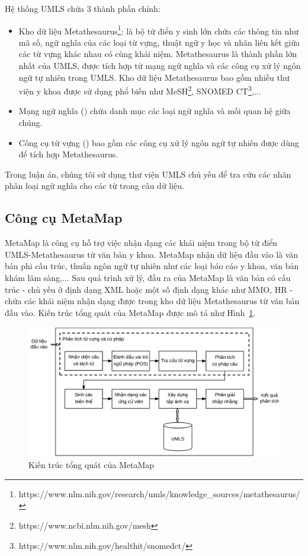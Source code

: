 Hệ thống UMLS chứa 3 thành phần chính:
\begin{itemize}
\item Kho dữ liệu Metathesaurus\footnote{https://www.nlm.nih.gov/research/umls/knowledge\_sources/metathesaurus/}: là bộ từ điển y sinh lớn chứa các thông tin như mã số, ngữ nghĩa của các loại từ vựng, thuật ngữ y học và nhãn liên kết giữa các từ vựng khác nhau có cùng khái niệm. Metathesaurus là thành phần lớn nhất của UMLS, được tích hợp từ mạng ngữ nghĩa và các công cụ xử lý ngôn ngữ tự nhiên trong UMLS. Kho dữ liệu Metathesaurus bao gồm nhiều thư viện y khoa được sử dụng phổ biến như MeSH\footnote{https://www.ncbi.nlm.nih.gov/mesh}, SNOMED CT\footnote{https://www.nlm.nih.gov/healthit/snomedct/},...
\item Mạng ngữ nghĩa () chứa danh mục các loại ngữ nghĩa và mối quan hệ giữa chúng.
\item Công cụ từ vựng () bao gồm các công cụ xử lý ngôn ngữ tự nhiên được dùng để tích hợp Metathesaurus.
\end{itemize}

Trong luận án, chúng tôi sử dụng thư viện UMLS chủ yếu để tra cứu các nhãn phân loại ngữ nghĩa cho các từ trong câu dữ liệu. 

\subsection*{Công cụ MetaMap}
MetaMap là công cụ hỗ trợ việc nhận dạng các khái niệm trong bộ từ điển UMLS-Metathesaurus từ văn bản y khoa. MetaMap nhận dữ liệu đầu vào là văn bản phi cấu trúc, thuần ngôn ngữ tự nhiên như các loại báo cáo y khoa, văn bản khám lâm sàng,... Sau quá trình xử lý, đầu ra của MetaMap là văn bản có cấu trúc - chủ yếu ở định dạng XML hoặc một số định dạng khác như MMO, HR - chứa các khái niệm nhận dạng được trong kho dữ liệu Metathesaurus từ văn bản đầu vào. Kiến trúc tổng quát của MetaMap được mô tả như Hình~\ref{fig:kientrucmetamap}.\\

\begin{figure}[h]
\centering
\includegraphics[scale=0.52]{../hinh/KienTrucMetamap.png}
\caption{Kiến trúc tổng quát của MetaMap \cite{Aronson2010}} \label{fig:kientrucmetamap}
\end{figure}


